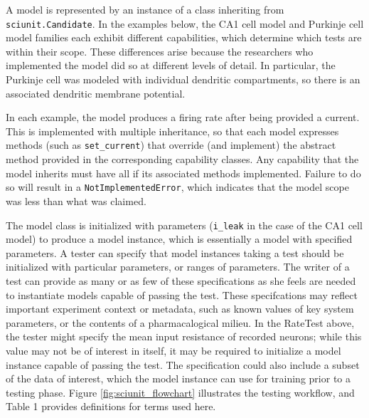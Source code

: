 \documentclass[a4paper,12pt]{article}
\begin{document}
A model is represented by an instance of a class inheriting from \verb|sciunit.Candidate|.  In the examples below, the CA1 cell model and Purkinje cell model families each exhibit different capabilities, which determine which tests are within their scope.  These differences arise because the researchers who implemented the model did so at different levels of detail.  In particular, the Purkinje cell was modeled with individual dendritic compartments, so there is an associated dendritic membrane potential. 

In each example, the model produces a firing rate after being provided a current.  This is implemented with multiple inheritance, so that each model expresses methods (such as \verb|set_current|) that override (and implement) the abstract method provided in the corresponding capability classes.  Any capability that the model inherits must have all if its associated methods implemented.  Failure to do so will result in a \verb|NotImplementedError|, which indicates that the model scope was less than what was claimed.  

The model class is initialized with parameters (\verb|i_leak| in the case of the CA1 cell model) to produce a model instance, which is essentially a model with specified parameters.  A tester can specify that model instances taking a test should be initialized with particular parameters, or ranges of parameters. The writer of a test can provide as many or as few of these specifications as she feels are needed to instantiate models capable of passing the test.  These specifcations may reflect important experiment context or metadata, such as known values of key system parameters, or the contents of a pharmacalogical milieu.  In the RateTest above, the tester might specify the mean input resistance of recorded neurons; while this value may not be of interest in itself, it may be required to initialize a model instance capable of passing the test.  The specification could also include a subset of the data of interest, which the model instance can use for training prior to a testing phase.  Figure \ref{fig:sciunit_flowchart} illustrates the testing workflow, and Table 1 provides definitions for terms used here.  

\end{document}
